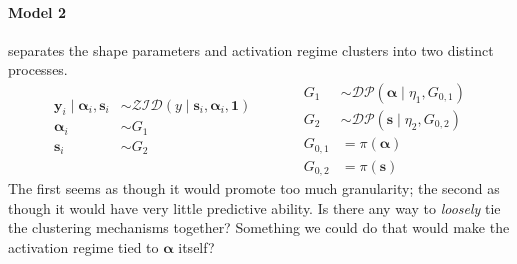 \documentclass{article}
\begin{document}
\paragraph{Model 2} separates the shape parameters and activation regime 
    clusters into two distinct processes.
\[
    \begin{aligned}
    \bm{y}_i\mid\bm{\alpha}_i,\bm{s}_i 
        &\sim \mathcal{ZID}(y\mid \bm{s}_i,\bm{\alpha}_i, \bm{1})\\
    \bm{\alpha}_i &\sim G_1\\
    \bm{s}_i &\sim G_2\\
    \end{aligned}
    \;\hspace{1cm}\;
    \begin{aligned}
    G_1 &\sim \mathcal{DP}(\bm{\alpha}\mid\eta_1,G_{0,1})\\
    G_2 &\sim \mathcal{DP}(\bm{s}\mid\eta_2,G_{0,2})\\
    G_{0,1} &= \pi(\bm{\alpha})\\
    G_{0,2} &= \pi(\bm{s})
    \end{aligned}
\]
The first seems as though it would promote too much granularity; the second as 
    though it would have very little predictive ability.  Is there any way to 
    \emph{loosely} tie the clustering mechanisms together?  Something we could 
    do that would make the activation regime tied to $\bm{\alpha}$ itself?
\end{document}
